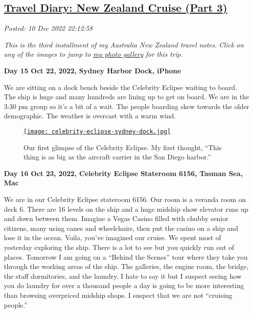 %

\subsection*{\href{http://analyzethedatanotthedrivel.org/2022/12/10/travel-diary-new-zealand-cruise-part-3/}{Travel Diary: New Zealand Cruise (Part 3)}}


\noindent\emph{Posted: 10 Dec 2022 22:12:58}
\vspace{6pt}

\emph{This is the third installment of my Australia New Zealand travel
notes}. \emph{Click on any of the images to jump to
\href{https://conceptcontrol.smugmug.com/Trips/Overseas/Australia-New-Zealand-2022/}{my
photo gallery} for this trip.}


\textbf{Day 15 Oct 22, 2022, Sydney Harbor Dock, iPhone}

We are sitting on a dock bench beside the Celebrity Eclipse waiting to
board. The ship is huge and many hundreds are lining up to get on board.
We are in the 3:30 pm group so it's a bit of a wait. The people boarding
skew towards the older demographic. The weather is overcast with a warm
wind.

\captionsetup[figure]{labelformat=empty}
\begin{SCfigure}
\centering
\href{https://conceptcontrol.smugmug.com/Trips/Overseas/Australia-New-Zealand-2022/i-VvRjC49/A}{\texttt{[image: celebrity-eclipse-sydney-dock.jpg]}}
\caption[Our first glimpse of the Celebrity Eclipse]{Our first glimpse of the Celebrity Eclipse. My first thought,
``This thing is as big as the aircraft carrier in the San Diego
harbor.''}
\label{fig:7606x0}
\end{SCfigure}

\textbf{Day 16 Oct 23, 2022, Celebrity Eclipse Stateroom 6156, Tasman Sea, Mac}

We are in our Celebrity Eclipse stateroom 6156. Our room is a veranda
room on deck 6. There are 16 levels on the ship and a huge midship show
elevator runs up and down between them. Imagine a Vegas Casino filled
with chubby senior citizens, many using canes and wheelchairs, then put
the casino on a ship and lose it in the ocean. Voila, you've imagined
our cruise. We spent most of yesterday exploring the ship. There is a
lot to see but you quickly run out of places. Tomorrow I am going on a
``Behind the Scenes'' tour where they take you through the working areas
of the ship. The galleries, the engine room, the bridge, the staff
dormitories, and the laundry. I hate to say it but I suspect seeing how
you do laundry for over a thousand people a day is going to be more
interesting than browsing overpriced midship shops. I suspect that we
are not ``cruising people.''


